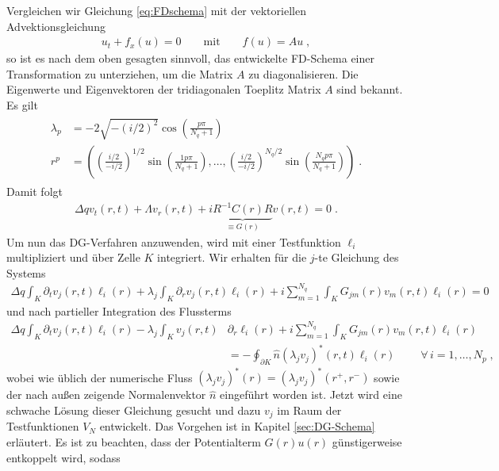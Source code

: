 Vergleichen wir Gleichung \eqref{eq:FDschema} mit der vektoriellen Advektionsgleichung
\begin{align}
  u_t + f_x(u) = 0 \qquad \text{mit} \qquad
  f(u) = Au \; ,
\end{align}
so ist es nach dem oben gesagten sinnvoll, das entwickelte FD-Schema einer Transformation zu unterziehen, um die Matrix $A$ zu diagonalisieren. Die Eigenwerte und Eigenvektoren der tridiagonalen Toeplitz Matrix $A$ sind bekannt. Es gilt
\begin{gather}
\begin{align}
  \lambda_p &= -2\sqrt{-(i/2)^2}\cos\left(\frac{p\pi}{N_q+1}\right) \\
  r^p &= \left( \left( \frac{i/2}{-i/2} \right)^{1/2} \sin \left( \frac{1 p\pi }{N_q+1} \right), \ldots , \left( \frac{i/2}{-i/2} \right)^{N_q/2} \sin \left( \frac{N_q p \pi}{N_q+1} \right) \right) \; .
\end{align}
\end{gather}
Damit folgt
\begin{align}
  \Delta q v_t(r,t) + \Lambda v_r(r,t) + i \underbrace{R^{-1}C(r)R}_{\equiv G(r)} v(r,t) = 0 \; .
  \label{eq:lvn_diagonalisiert}
\end{align}
Um nun das DG-Verfahren anzuwenden, wird mit einer Testfunktion $\ell_i$ multipliziert und über Zelle $K$ integriert. Wir erhalten für die $j$-te Gleichung des Systems
\begin{align*}
  \Delta q \int_K \partial_t v_j(r,t)\ell_i(r) + \lambda_j \int_K \partial_r v_j(r,t) \ell_i(r) + i \sum_{m=1}^{N_q} \int_K G_{jm}(r) v_m(r,t) \ell_i(r) = 0
\end{align*}
und nach partieller Integration des Flussterms
\begin{align*}
  \Delta q \int_K \partial_t v_j(r,t)\ell_i(r) - \lambda_j \int_K v_j(r,t) &\partial_r\ell_i(r) + i \sum_{m=1}^{N_q} \int_K G_{jm}(r) v_m(r,t) \ell_i(r)\\
      &= - \oint_{\partial K}  \hat{n} (\lambda_j v_j)^*(r,t)\ell_i(r) \;  \qquad \forall\, i=1,\dots,N_p \;,
      \label{eq:weakform_roh}
\end{align*}
wobei wie üblich der numerische Fluss $(\lambda_j v_j)^*(r) = (\lambda_j v_j)^*(r^+, r^-)$ sowie der nach außen zeigende Normalenvektor $\hat{n}$ eingeführt worden ist. Jetzt wird eine schwache Lösung dieser Gleichung gesucht und dazu $v_j$ im Raum der Testfunktionen $V_N$ entwickelt. Das Vorgehen ist in Kapitel \ref{sec:DG-Schema} erläutert. Es ist zu beachten, dass der Potentialterm $G(r)u(r)$ günstigerweise entkoppelt wird, sodass

